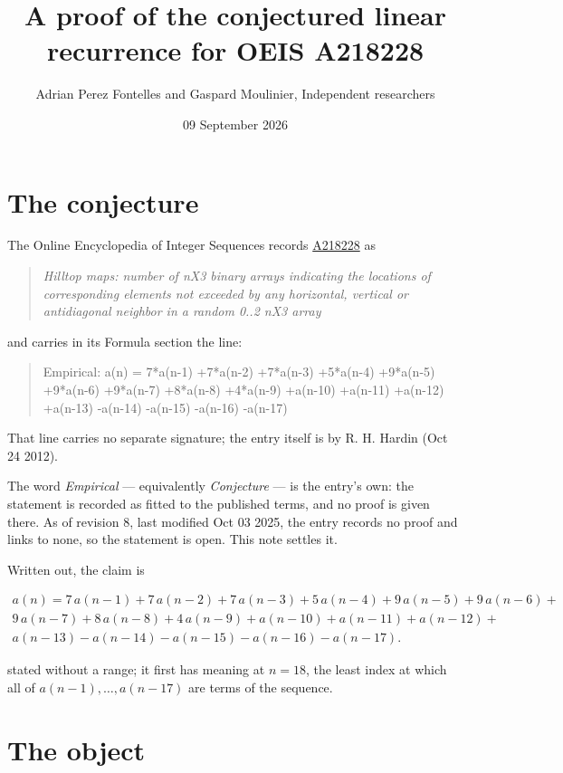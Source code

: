 \documentclass[11pt]{article}
\title{A proof of the conjectured linear recurrence for OEIS A218228}
\author{Adrian Perez Fontelles and Gaspard Moulinier, Independent researchers}
\date{09 September 2026}
\theoremstyle{definition}
\begin{document}
\maketitle
\section{The conjecture}

The Online Encyclopedia of Integer Sequences records \href{https://oeis.org/A218228}{A218228} as

\begin{quote}\itshape Hilltop maps: number of nX3 binary arrays indicating the locations of corresponding elements not exceeded by any horizontal, vertical or antidiagonal neighbor in a random 0..2 nX3 array\end{quote}

and carries in its Formula section the line:

\begin{quote}\ttfamily Empirical: a(n) = 7*a(n-1) +7*a(n-2) +7*a(n-3) +5*a(n-4) +9*a(n-5) +9*a(n-6) +9*a(n-7) +8*a(n-8) +4*a(n-9) +a(n-10) +a(n-11) +a(n-12) +a(n-13) -a(n-14) -a(n-15) -a(n-16) -a(n-17)\end{quote}

That line carries no separate signature; the entry itself is by R. H. Hardin (Oct 24 2012).

The word {\itshape Empirical} --- equivalently {\itshape Conjecture} --- is the entry's own: the statement is recorded as fitted to the published terms, and no proof is given there. As of revision 8, last modified Oct 03 2025, the entry records no proof and links to none, so the statement is open. This note settles it.

Written out, the claim is

\begin{multline*} a(n) = 7\,a(n-1) + 7\,a(n-2) + 7\,a(n-3) + 5\,a(n-4) + 9\,a(n-5) + 9\,a(n-6) + \\ 9\,a(n-7) + 8\,a(n-8) + 4\,a(n-9) + a(n-10) + a(n-11) + a(n-12) + \\ a(n-13) - a(n-14) - a(n-15) - a(n-16) - a(n-17). \end{multline*}

stated without a range; it first has meaning at $n = 18$, the least index at which all of $a(n-1),\dots,a(n-17)$ are terms of the sequence.

\section{The object}
\end{document}
